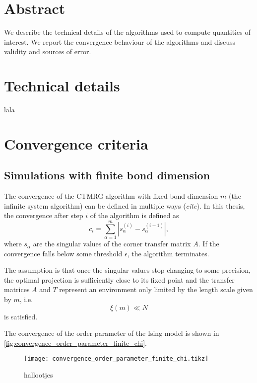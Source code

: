 \section{Abstract}

We describe the technical details of the algorithms used to compute quantities of interest.
We report the convergence behaviour of the algorithms and discuss validity and sources of error.

\section{Technical details}
lala

\section{Convergence criteria}

\subsection{Simulations with finite bond dimension}
The convergence of the CTMRG algorithm with fixed bond dimension $m$ (the infinite system algorithm) can be defined
in multiple ways (\emph{cite}). In this thesis, the convergence after step $i$ of the algorithm is defined as
\begin{equation}
  c_i = \sum_{\alpha = 1}^{m} | s_{\alpha}^{(i)} - s_{\alpha}^{(i - 1)} |,
\end{equation}
where $s_{\alpha}$ are the singular values of the corner transfer matrix $A$. If the convergence falls below some
threshold $\epsilon$, the algorithm terminates.

The assumption is that once the singular values stop changing to some precision, the optimal projection is sufficiently
close to its fixed point and the transfer matrices $A$ and $T$ represent an environment only limited by the length scale
given by $m$, i.e.
\begin{equation}
  \xi(m) \ll N
\end{equation}
is satisfied.

The convergence of the order parameter of the Ising model is shown in
\autoref{fig:convergence_order_parameter_finite_chi}.


\begin{figure}
  \texttt{[image: convergence\_order\_parameter\_finite\_chi.tikz]}
  \caption{hallootjes}\label{fig:convergence_order_parameter_finite_chi}
\end{figure}


